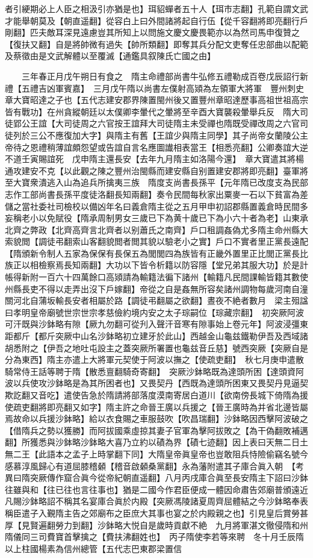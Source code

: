 者引綆期必上人臣之相汲引亦猶是也】珥貂蟬者五十人【珥市志翻】孔範自謂文武才能舉朝莫及【朝直遥翻】從容白上曰外間諸將起自行伍【從千容翻將即亮翻行戶剛翻】匹夫敵耳深見遠慮豈其所知上以問施文慶文慶畏範亦以為然司馬申復贊之【復扶又翻】自是將帥微有過失【帥所類翻】即奪其兵分配文吏奪任忠部曲以配範及蔡徵由是文武解體以至覆滅【通鑑具叙陳氏亡國之由】

　　三年春正月戊午朔日有食之　隋主命禮部尚書牛弘修五禮勒成百卷戊辰詔行新禮【五禮吉凶軍賓嘉】　三月戊午隋以尚書左僕射高熲為左領軍大將軍　豐州刺史章大寶昭達之子也【五代志建安郡界陳置閩州後又置豐州章昭達歷事高祖世祖高宗皆有戰功】在州貪縱朝廷以太僕卿李暈代之暈將至辛酉大寶襲殺暈舉兵反　隋大司徒郢公王誼【大司徒周之六官按王誼拜大司徒隋主未受禪也隋既受禪改周之六官司徒列於三公不應復加大字】與隋主有舊【王誼少與隋主同學】其子尚帝女蘭陵公主帝待之恩禮稍薄誼頗怨望或告誼自言名應圖䜟相表當王【相悉亮翻】公卿奏誼大逆不道壬寅賜誼死　戊申隋主還長安【去年九月隋主如洛陽今還】　章大寶遣其將楊通攻建安不克【以此觀之陳之豐州治閩縣而建安縣自别置建安郡將即亮翻】臺軍將至大寶衆潰逃入山為追兵所擒夷三族　隋度支尚書長孫平【元年隋已改度支為民部志作工部尚書長孫平度徒洛翻長知兩翻】奏令民間每秋家出粟麥一石以下貧富為差儲之當社委社司檢校以備凶年名曰義倉隋主從之五月甲申初詔郡縣置義倉時民間多妄稱老小以免賦役【隋承周制男女三歲已下為黄十歲已下為小六十者為老】山東承北齊之弊政【北齊高齊言北齊者以别蕭氏之南齊】戶口租調姦偽尤多隋主命州縣大索貌閲【調徒弔翻索山客翻貌閲者閲其貌以驗老小之實】戶口不實者里正黨長遠配【隋頒新令制人五家為保保有長保五為閭閭四為族皆有正畿外置里正比閭正黨長比族正以相檢察焉長知兩翻】大功以下皆令析籍以防容隱【堂兄弟其服大功】於是計帳得新附一百六十四萬餘口高熲請為輸籍法徧下諸州【輸籍凡民間課輸皆籍其數使州縣長吏不得以走弄出沒下戶嫁翻】帝從之自是姦無所容矣諸州調物每歲河南自潼關河北自蒲坂輸長安者相屬於路【調徒弔翻屬之欲翻】晝夜不絶者數月　梁主殂諡曰孝明皇帝廟號世宗世宗孝慈儉約境内安之太子琮嗣位【琮藏宗翻】　初突厥阿波可汗既與沙鉢略有隙【厥九勿翻可從刋入聲汗音寒有隙事始上卷元年】阿波浸彊東距都斤【都斤突厥中山名沙鉢略初立建牙於此山】西越金山龜兹鐵勒伊吾及西域諸胡悉附之【伊吾之地吐屯設主之蓋突厥所署置也龜兹音丘慈】號西突厥【突厥自是分為東西】隋主亦遣上大將軍元契使于阿波以撫之【使疏吏翻】　秋七月庚申遣散騎常侍王話等聘于隋【散悉亶翻騎奇寄翻】　突厥沙鉢略既為達頭所困【達頭資阿波以兵使攻沙鉢略是為其所困者也】又畏契丹【西既為達頭所困東又畏契丹見逼契欺訖翻又音吃】遣使告急於隋請將部落度漠南寄居白道川【欲南傍長城下倚隋為援使疏吏翻將即亮翻又如字】隋主許之命晉王廣以兵援之【晉王廣時為并省北邊皆屬焉故命以兵援沙鉢略】給以衣食賜之車服鼓吹【吹昌瑞翻】沙鉢略因西擊阿波破之【借隋兵之勢以獲勝】而阿拔國乘虛掠其妻子官軍為擊阿拔敗之【為干偽翻敗補邁翻】所獲悉與沙鉢略沙鉢略大喜乃立約以磧為界【磧七迹翻】因上表曰天無二日土無二王【此語本之孟子上時掌翻下同】大隋皇帝眞皇帝也豈敢阻兵恃險偷竊名號今感慕淳風歸心有道屈膝稽顙【稽音啟顙桑黨翻】永為藩附遣其子庫合眞入朝　【考異曰隋突厥傳作窟合眞今從帝紀朝直遥翻】八月丙戌庫合眞至長安隋主下詔曰沙鉢往雖與和【往已往也言往事也】猶是二國今作君臣便成一體因命肅告郊廟普頒遠近凡賜沙鉢略詔不稱其名宴庫合眞於内殿【突厥馮陵諸夏周齊屈體結之今沙鉢略奉表稱臣遣子入覲隋主告之郊廟布之臣庶大其事也宴之於内殿親之也】引見皇后賞勞甚厚【見賢遍翻勞力到翻】沙鉢略大悦自是歲時貢獻不絶　九月將軍湛文徹侵隋和州隋儀同三司費寶首擊擒之【費扶沸翻姓也】　丙子隋使李若等來聘　冬十月壬辰隋以上柱國楊素為信州總管【五代志巴東郡梁置信